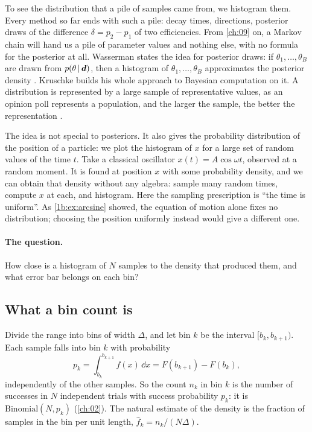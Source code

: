 To see the distribution that a pile of samples came from, we histogram them. Every method
so far ends with such a pile: decay times, directions, posterior draws of the difference
$\delta=p_2-p_1$ of two efficiencies. From \cref{ch:09} on, a Markov chain will hand us a
pile of parameter values and nothing else, with no formula for the posterior at all.
Wasserman states the idea for posterior draws: if
$\theta_1,\dots,\theta_B$ are drawn from $p(\theta\,\vert\,\bm{d})$, then a histogram of
$\theta_1,\dots,\theta_B$ approximates the posterior density .
Kruschke builds his whole approach to Bayesian computation on it. A distribution is
represented by a large sample of representative values, as an opinion poll represents a
population, and the larger the sample, the better the representation
.

The idea is not special to posteriors. It also gives the probability distribution of the
position of a particle: we plot the histogram of $x$ for a large set of random values of the
time $t$. Take a classical oscillator $x(t)=A\cos\omega t$, observed at a random moment.
It is found at position $x$ with some probability density, and we can obtain that density
without any algebra: sample many random times, compute $x$ at each, and histogram. Here the
sampling prescription is ``the time is uniform''. As \cref{1b:ex:arcsine} showed, the
equation of motion alone fixes no distribution; choosing the position uniformly instead
would give a different one.

\paragraph{The question.} How close is a histogram of $N$ samples to the density that
produced them, and what error bar belongs on each bin?

\subsection{What a bin count is}
\label{6b:sec:bin-count}

Divide the range into bins of width $\Delta$, and let bin $k$ be the interval
$[b_k,b_{k+1})$. Each sample falls into bin $k$ with probability
\[
  p_k=\int_{b_k}^{b_{k+1}}f(x)\,\dd x=F(b_{k+1})-F(b_k),
\]
independently of the other samples. So the count $n_k$ in bin $k$ is the number of successes
in $N$ independent trials with success probability $p_k$: it is
$\mathrm{Binomial}(N,p_k)$ (\cref{ch:02}). The natural estimate of the density is the
fraction of samples in the bin per unit length, $\hat f_k=n_k/(N\Delta)$.

